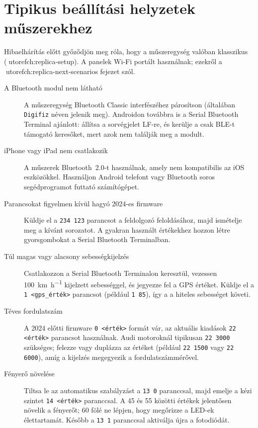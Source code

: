 \chapter{Tipikus beállítási helyzetek \ReplicaGenOne{} műszerekhez}\label{ch:replica-scenarios}

Hibaelhárítás előtt győződjön meg róla, hogy a műszeregység valóban klasszikus \ReplicaGenOne{} (utoref{ch:replica-setup}). A \ReplicaNextLong{} panelek Wi-Fi portált használnak; ezekről a utoref{ch:replica-next-scenarios} fejezet szól.

\begin{description}
    \item[A Bluetooth modul nem látható] A műszeregység Bluetooth Classic interfészéhez párosítson (általában \texttt{Digifiz} néven jelenik meg). Androidon továbbra is a Serial Bluetooth Terminal ajánlott: állítsa a sorvégjelet LF-re, és kerülje a csak BLE-t támogató keresőket, mert azok nem találják meg a modult.
    \item[iPhone vagy iPad nem csatlakozik] A \ReplicaGenOneShort{} műszerek Bluetooth~2.0-t használnak, amely nem kompatibilis az iOS eszközökkel. Használjon Android telefont vagy Bluetooth soros segédprogramot futtató számítógépet.
    \item[Parancsokat figyelmen kívül hagyó 2024-es firmware] Küldje el a \verb|234 123| parancsot a feldolgozó feloldásához, majd ismételje meg a kívánt sorozatot. A gyakran használt értékekhez hozzon létre gyorsgombokat a Serial Bluetooth Terminalban.
    \item[Túl magas vagy alacsony sebességkijelzés] Csatlakozzon a Serial Bluetooth Terminalon keresztül, vezessen \SI{100}{\kilo\metre\per\hour} kijelzett sebességgel, és jegyezze fel a GPS értéket. Küldje el a \verb|1 <gps_érték>| parancsot (például \verb|1 85|), így a  a hiteles sebességet követi.
    \item[Téves fordulatszám] A 2024 előtti firmware \verb|0 <érték>| formát vár, az aktuális kiadások \verb|22 <érték>| parancsot használnak. Audi motoroknál tipikusan \verb|22 3000| szükséges; felezze vagy duplázza az értéket (például \verb|22 1500| vagy \verb|22 6000|), amíg a kijelzés megegyezik a fordulatszámmérővel.
    \item[Fényerő növelése] Tiltsa le az automatikus szabályzást a \verb|13 0| paranccsal, majd emelje a kézi szintet \verb|14 <érték>| paranccsal. A 45 és 55 közötti értékek jelentősen növelik a fényerőt; 60 fölé ne lépjen, hogy megőrizze a LED-ek élettartamát. Később a \verb|13 1| paranccsal aktiválja újra a fotodiódát.

\end{description}
